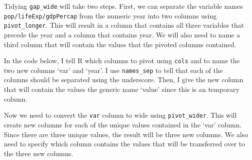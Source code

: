 \documentclass[
]{book}
\newenvironment{Shaded}{\begin{snugshade}}{\end{snugshade}}
\newcommand{\DataTypeTok}[1]{\textcolor[rgb]{0.13,0.29,0.53}{#1}}
\newcommand{\DecValTok}[1]{\textcolor[rgb]{0.00,0.00,0.81}{#1}}
\newcommand{\KeywordTok}[1]{\textcolor[rgb]{0.13,0.29,0.53}{\textbf{#1}}}
\newcommand{\NormalTok}[1]{#1}
\newcommand{\OperatorTok}[1]{\textcolor[rgb]{0.81,0.36,0.00}{\textbf{#1}}}
\newcommand{\OtherTok}[1]{\textcolor[rgb]{0.56,0.35,0.01}{#1}}
\newcommand{\StringTok}[1]{\textcolor[rgb]{0.31,0.60,0.02}{#1}}
\begin{document}
Tidying \texttt{gap\_wide} will take two steps. First, we can separate the variable names \texttt{pop/lifeExp/gdpPercap} from the numeric year into two columns using \texttt{pivot\_longer}. This will result in a column that contains all three variables that precede the year and a column that contains year. We will also need to name a third column that will contain the values that the pivoted columns contained.

In the code below, I tell R which columns to pivot using \texttt{cols} and to name the two new columns `var' and `year'. I use \texttt{names\_sep} to tell that each of the columns should be separated using the underscore. Then, I give the new column that will contain the values the generic name `value' since this is an temporary column.

\begin{Shaded}
\end{Shaded}

\hypertarget{htmlwidget-7fc88bba3c0a6a827e77}{}
\begin{datatables}

\end{datatables}

Now we need to convert the \texttt{var} column to wide using \texttt{pivot\_wider}. This will create new columns for each of the unique values contained in the `var' column. Since there are three unique values, the result will be three new columns. We also need to specify which column contains the values that will be transferred over to the three new columns.
\end{document}
